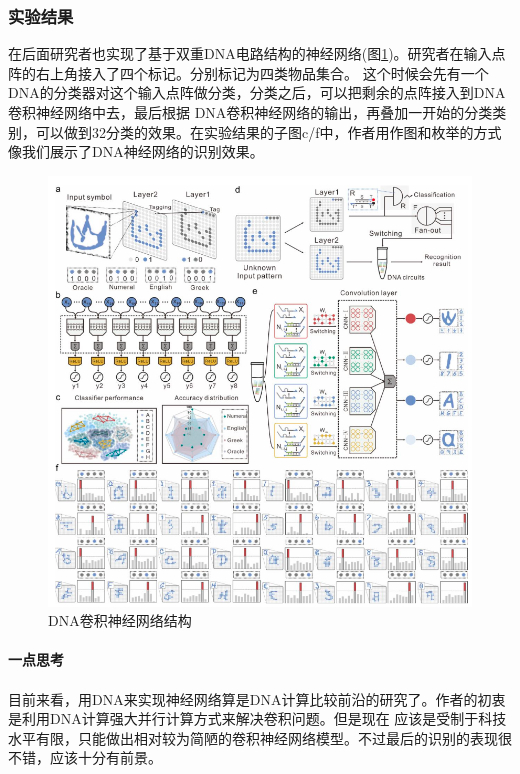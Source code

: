 \documentclass[a4paper,twoside]{article}
\begin{document}
\subsubsection{实验结果}
在后面研究者也实现了基于双重DNA电路结构的神经网络(图\ref{dna-cnn-result})。研究者在输入点阵的右上角接入了四个标记。分别标记为四类物品集合。
这个时候会先有一个DNA的分类器对这个输入点阵做分类，分类之后，可以把剩余的点阵接入到DNA卷积神经网络中去，最后根据
DNA卷积神经网络的输出，再叠加一开始的分类类别，可以做到32分类的效果。在实验结果的子图c/f中，作者用作图和枚举的方式
像我们展示了DNA神经网络的识别效果。
\newpage
\begin{figure}[htbp]
	\centering
	\includegraphics[width=0.9\linewidth]{images/dna-cnn-result.png}
	\caption{DNA卷积神经网络结构}
	\label{dna-cnn-result}
\end{figure}
\paragraph{一点思考}

\paragraph*{}
目前来看，用DNA来实现神经网络算是DNA计算比较前沿的研究了。作者的初衷是利用DNA计算强大并行计算方式来解决卷积问题。但是现在
应该是受制于科技水平有限，只能做出相对较为简陋的卷积神经网络模型。不过最后的识别的表现很不错，应该十分有前景。
\end{document}

